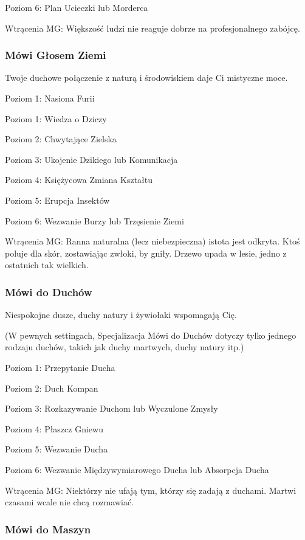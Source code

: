Poziom 6: Plan Ucieczki lub Morderca

Wtrącenia MG: Większość ludzi nie reaguje dobrze na profesjonalnego zabójcę.

\subsubsection{Mówi Głosem Ziemi}

Twoje duchowe połączenie z naturą i środowiskiem daje Ci mistyczne moce.

Poziom 1: Nasiona Furii

Poziom 1: Wiedza o Dziczy

Poziom 2: Chwytające Zielska

Poziom 3: Ukojenie Dzikiego lub Komunikacja

Poziom 4: Księżycowa Zmiana Kształtu

Poziom 5: Erupcja Insektów

Poziom 6: Wezwanie Burzy lub Trzęsienie Ziemi

Wtrącenia MG: Ranna naturalna (lecz niebezpieczna) istota jest odkryta. Ktoś poluje dla skór, zostawiając zwłoki, by gniły. Drzewo upada w lesie, jedno z ostatnich tak wielkich.

\subsubsection{Mówi do Duchów}

Niespokojne dusze, duchy natury i żywiołaki wspomagają Cię.

(W pewnych settingach, Specjalizacja Mówi do Duchów dotyczy tylko jednego rodzaju duchów, takich jak duchy martwych, duchy natury itp.)

Poziom 1: Przepytanie Ducha

Poziom 2: Duch Kompan

Poziom 3: Rozkazywanie Duchom lub Wyczulone Zmysły

Poziom 4: Płaszcz Gniewu

Poziom 5: Wezwanie Ducha

Poziom 6: Wezwanie Międzywymiarowego Ducha lub Absorpcja Ducha

Wtrącenia MG: Niektórzy nie ufają tym, którzy się zadają z duchami. Martwi czasami wcale nie chcą rozmawiać. 

\subsubsection{Mówi do Maszyn}

